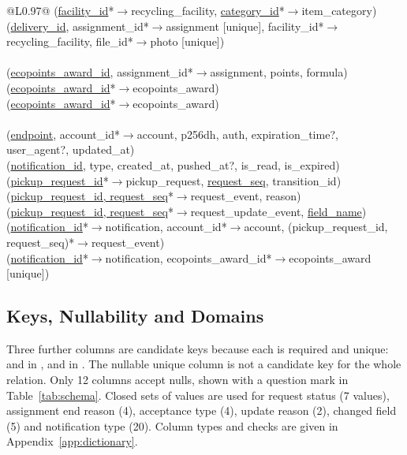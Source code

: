 \documentclass[11pt,letterpaper]{article}
\begin{document}
{\begin{longtable}{@{}L{0.97\linewidth}@{}}
(\underline{facility\_id}*$\rightarrow$recycling\_facility, \underline{category\_id}*$\rightarrow$item\_category) \\
(\underline{delivery\_id}, assignment\_id*$\rightarrow$assignment [unique], facility\_id*$\rightarrow$recycling\_facility, file\_id*$\rightarrow$photo [unique]) \\
\addlinespace
{} \\
(\underline{ecopoints\_award\_id}, assignment\_id*$\rightarrow$assignment, points, formula) \\
(\underline{ecopoints\_award\_id}*$\rightarrow$ecopoints\_award) \\
(\underline{ecopoints\_award\_id}*$\rightarrow$ecopoints\_award) \\
\addlinespace
{} \\
(\underline{endpoint}, account\_id*$\rightarrow$account, p256dh, auth, expiration\_time?, user\_agent?, updated\_at) \\
(\underline{notification\_id}, type, created\_at, pushed\_at?, is\_read, is\_expired) \\
(\underline{pickup\_request\_id}*$\rightarrow$pickup\_request, \underline{request\_seq}, transition\_id) \\
(\underline{pickup\_request\_id, request\_seq}*$\rightarrow$request\_event, reason) \\
(\underline{pickup\_request\_id, request\_seq}*$\rightarrow$request\_update\_event, \underline{field\_name}) \\
(\underline{notification\_id}*$\rightarrow$notification, account\_id*$\rightarrow$account, (pickup\_request\_id, request\_seq)*$\rightarrow$request\_event) \\
(\underline{notification\_id}*$\rightarrow$notification, ecopoints\_award\_id*$\rightarrow$ecopoints\_award [unique]) \\
\end{longtable}
}

\subsection{Keys, Nullability and Domains}
Three further columns are candidate keys because each is required and unique:  and  in , and  in . The nullable unique column  is not a candidate key for the whole relation. Only 12 columns accept nulls, shown with a question mark in Table~\ref{tab:schema}. Closed sets of values are used for request status (7 values), assignment end reason (4), acceptance type (4), update reason (2), changed field (5) and notification type (20). Column types and checks are given in Appendix~\ref{app:dictionary}.
\end{document}

